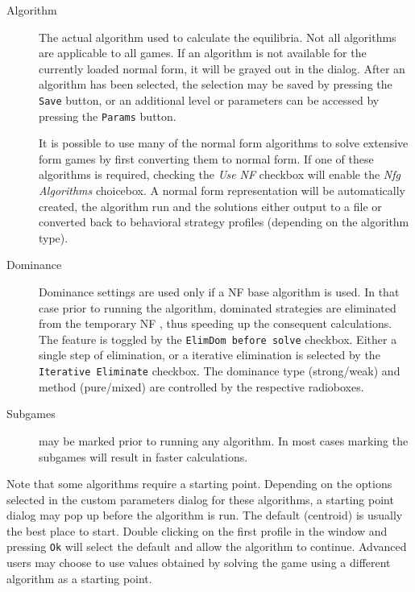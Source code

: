 \begin{description}
\item[Algorithm] The actual algorithm used to calculate the equilibria.  Not all algorithms
are applicable to all games.  If an algorithm is not available for the
currently loaded normal form, it will be grayed out in the dialog.  After an
algorithm has been selected, the selection may be saved by pressing 
the {\tt Save} button, or an additional level or parameters can be accessed by
pressing the {\tt Params} button.

It is possible to use many of the normal form algorithms to solve
extensive form games by first converting them to normal form.  If one of
these algorithms is required, checking the {\em Use NF} checkbox will
enable the {\em Nfg Algorithms} choicebox.  A normal form representation
will be automatically created, the algorithm run and the solutions either
output to a file or converted back to behavioral strategy profiles
(depending on the algorithm type).
\item[Dominance] Dominance settings are used only if a NF base algorithm is
used.  In that case prior to running the algorithm, 
dominated strategies are eliminated from the temporary NF , thus
speeding up the consequent calculations.  The feature is toggled by 
the {\tt ElimDom before solve} checkbox.  Either a single step of elimination,
or a iterative elimination is selected by the {\tt Iterative Eliminate} 
checkbox.  The dominance type (strong/weak) and method (pure/mixed) are controlled
by the respective radioboxes.
\item[Subgames]  may be marked prior to running
any algorithm.  In most cases marking the subgames will result in faster 
calculations.
\end{description}

Note that some algorithms require a starting point.  Depending on the
options selected in the custom parameters dialog for these algorithms,
a starting point dialog may pop up before the algorithm is run.  The
default (centroid) is usually the best place to start.  Double clicking on
the first profile in the window and pressing {\tt Ok} will select the
default and allow the algorithm to continue.  Advanced users may choose to
use values obtained by solving the game using a different algorithm as a
starting point.

